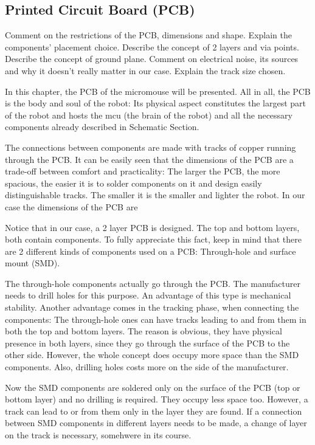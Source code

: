 \subsection{Printed Circuit Board (PCB)}

Comment on the restrictions of the PCB, dimensions and shape.
Explain the components' placement choice.
Describe the concept of 2 layers and via points.
Describe the concept of ground plane.
Comment on electrical noise, its sources and why it doesn't really matter in our case.
Explain the track size chosen.

In this chapter, the PCB of the micromouse will be presented. All in all, the PCB is the body and soul of the robot: Its physical aspect constitutes the largest part of the robot and hosts the mcu (the brain of the robot) and all the necessary components already described in Schematic Section. 

The connections between components are made with tracks of copper running through the PCB. It can be easily seen that the dimensions of the PCB are a trade-off between comfort and practicality: The larger the PCB, the more spacious, the easier it is to solder components on it and design easily distinguishable tracks. The smaller it is the smaller and lighter the robot. In our case the dimensions of the PCB are 

Notice that in our case, a 2 layer PCB is designed. The top and bottom layers, both contain components. To fully appreciate this fact, keep in mind that there are 2 different kinds of components used on a PCB: Through-hole and surface mount (SMD). 

The through-hole components actually go through the PCB. The manufacturer needs to drill holes for this purpose. An advantage of this type is mechanical stability. Another advantage comes in the tracking phase, when connecting the components: The through-hole ones can have tracks leading to and from them in both the top and bottom layers. The reason is obvious, they have physical presence in both layers, since they go through the surface of the PCB to the other side. However, the whole concept does occupy more space than the SMD components. Also, drilling holes costs more on the side of the manufacturer.

Now the SMD components are soldered only on the surface of the PCB (top or bottom layer) and no drilling is required. They occupy less space too. However, a track can lead to or from them only in the layer they are found. If a connection between SMD components in different layers needs to be made, a change of layer on the track is necessary, somehwere in its course.

